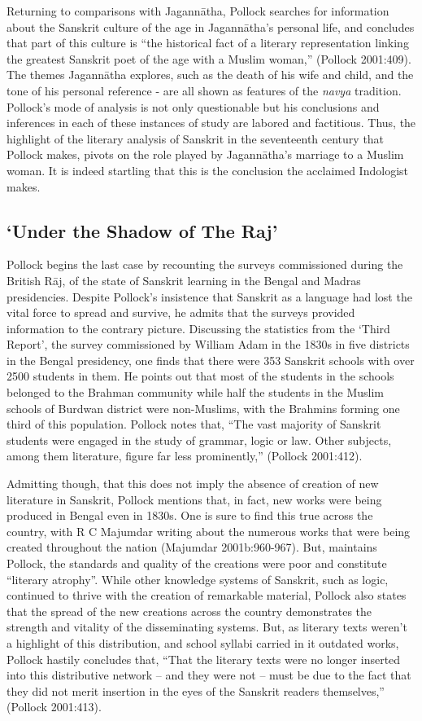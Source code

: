 Returning to comparisons with Jagannātha, Pollock searches for information about the Sanskrit culture of the age in Jagannātha’s personal life, and concludes that part of this culture is “the historical fact of a literary representation linking the greatest Sanskrit poet of the age with a Muslim woman,” (Pollock 2001:409). The themes Jagannātha explores, such as the death of his wife and child, and the tone of his personal reference  - are all shown as features of the {\sl navya} tradition. Pollock’s mode of analysis is not only questionable but his conclusions and inferences in each of these instances of study are labored and factitious. Thus, the highlight of the literary analysis of Sanskrit in the seventeenth century that Pollock makes, pivots on the role played by Jagannātha’s marriage to a Muslim woman. It is indeed startling that this is the conclusion the acclaimed Indologist makes.

\subsection{‘Under the Shadow of The Raj’}

Pollock begins the last case by recounting the surveys commissioned during the British Rāj, of the state of Sanskrit learning in the Bengal and Madras presidencies. Despite Pollock’s insistence that Sanskrit as a language had lost the vital force to spread and survive, he admits that the surveys provided information to the contrary picture. Discussing the statistics from the ‘Third Report’, the survey commissioned by William Adam in the 1830s in five districts in the Bengal presidency, one finds that there were 353 Sanskrit schools with over 2500 students in them. He points out that most of the students in the schools belonged to the Brahman community while half the students in the Muslim schools of Burdwan district were non-Muslims, with the Brahmins forming one third of this population. Pollock notes that, “The vast majority of Sanskrit students were engaged in the study of grammar, logic or law. Other subjects, among them literature, figure far less prominently,” (Pollock 2001:412).

Admitting though, that this does not imply the absence of creation of new literature in Sanskrit, Pollock mentions that, in fact, new works were being produced in Bengal even in 1830s. One is sure to find this true across the country, with R C Majumdar writing about the numerous works that were being created throughout the nation (Majumdar 2001b:960-967). But, maintains Pollock, the standards and quality of the creations were poor and constitute “literary atrophy”. While other knowledge systems of Sanskrit, such as logic, continued to thrive with the creation of remarkable material, Pollock also states that the spread of the new creations across the country demonstrates the strength and vitality of the disseminating systems. But, as literary texts  weren’t a highlight of this distribution, and school syllabi carried in it outdated works, Pollock hastily concludes that, “That the literary texts were no longer inserted into this distributive network – and they were not – must be due to the fact that they did not merit insertion in the eyes of the Sanskrit readers themselves,” (Pollock 2001:413).

